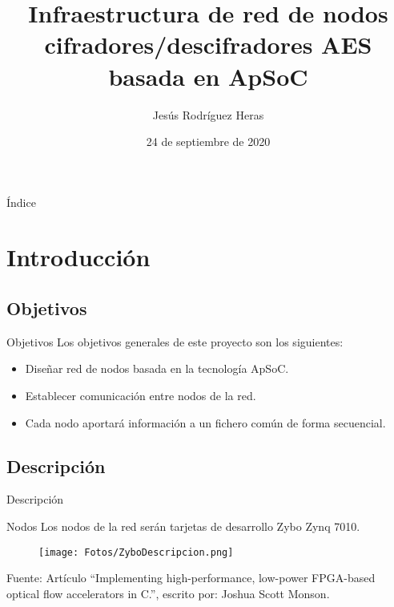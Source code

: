 \documentclass[aspectratio=169]{beamer}
\title{Infraestructura de red de nodos cifradores/descifradores AES basada en ApSoC}
\author{Jesús Rodríguez Heras}
\date{24 de septiembre de 2020}
\begin{document}
\begin{frame}
  \titlepage
  
\end{frame}

\begin{frame}{Índice}
\tableofcontents
\end{frame}

\section{Introducción}
\subsection{Objetivos}
\begin{frame}{Objetivos}
Los objetivos generales de este proyecto son los siguientes:
\begin{itemize}
	\item Diseñar red de nodos basada en la tecnología ApSoC.
	\item Establecer comunicación entre nodos de la red.
	\item Cada nodo aportará información a un fichero común de forma secuencial.
\end{itemize}
\end{frame}

\subsection{Descripción}
\begin{frame}{Descripción}
\begin{block}{Nodos}
	Los nodos de la red serán tarjetas de desarrollo Zybo Zynq 7010.
\end{block}
\begin{figure}[h]
	\centering
	\texttt{[image: Fotos/ZyboDescripcion.png]}
\end{figure}
\begin{center}
	Fuente: Artículo ``Implementing high-performance, low-power FPGA-based optical flow accelerators in C.'', escrito por: Joshua Scott Monson.
\end{center}
\end{frame}
\end{document}
